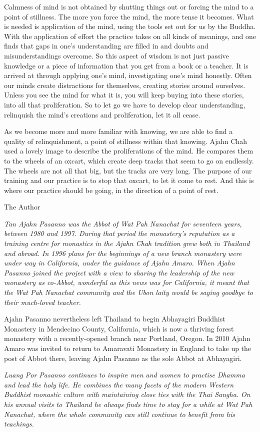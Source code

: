 Calmness of mind is not obtained by shutting things out or forcing the
mind to a point of stillness. The more you force the mind, the more
tense it becomes. What is needed is application of the mind, using the
tools set out for us by the Buddha. With the application of effort the
practice takes on all kinds of meanings, and one finds that gaps in
one's understanding are filled in and doubts and misunderstandings
overcome. So this aspect of wisdom is not just passive knowledge or a
piece of information that you get from a book or a teacher. It is
arrived at through applying one's mind, investigating one's mind
honestly. Often our minds create distractions for themselves, creating
stories around ourselves. Unless you see the mind for what it is, you
will keep buying into these stories, into all that proliferation. So to
let go we have to develop clear understanding, relinquish the mind's
creations and proliferation, let it all cease.

As we become more and more familiar with knowing, we are able to find a
quality of relinquishment, a point of stillness within that knowing.
Ajahn Chah used a lovely image to describe the proliferations of the
mind. He compares them to the wheels of an oxcart, which create deep
tracks that seem to go on endlessly. The wheels are not all that big,
but the tracks are very long. The purpose of our training and our
practice is to stop that oxcart, to let it come to rest. And this is
where our practice should be going, in the direction of a point of rest.



The Author

\emph{Tan Ajahn Pasanno was the Abbot of Wat Pah Nanachat for seventeen
years, between 1980 and 1997. During that period the monastery's
reputation as a training centre for monastics in the Ajahn Chah
tradition grew both in Thailand and abroad. In 1996 plans for the
beginnings of a new branch monastery were under way in California, under
the guidance of Ajahn Amaro. When Ajahn Pasanno joined the project with
a view to sharing the leadership of the new monastery as co-Abbot,
wonderful as this news was for California, it meant that the Wat Pah
Nanachat community and the Ubon laity would be saying goodbye to their
much-loved teacher.}

Ajahn Pasanno nevertheless left Thailand to begin Abhayagiri Buddhist
Monastery in Mendecino County, California, which is now a thriving
forest monastery with a recently-opened branch near Portland, Oregon. In
2010 Ajahn Amaro was invited to return to Amaravati Monastery in England
to take up the post of Abbot there, leaving Ajahn Pasanno as the sole
Abbot at Abhayagiri.

\emph{Luang Por Pasanno continues to inspire men and women to practise
Dhamma and lead the holy life. He combines the many facets of the modern
Western Buddhist monastic culture with maintaining close ties with the
Thai Sangha. On his annual visits to Thailand he always finds time to
stay for a while at Wat Pah Nanachat, where the whole community can
still continue to benefit from his teachings.}

